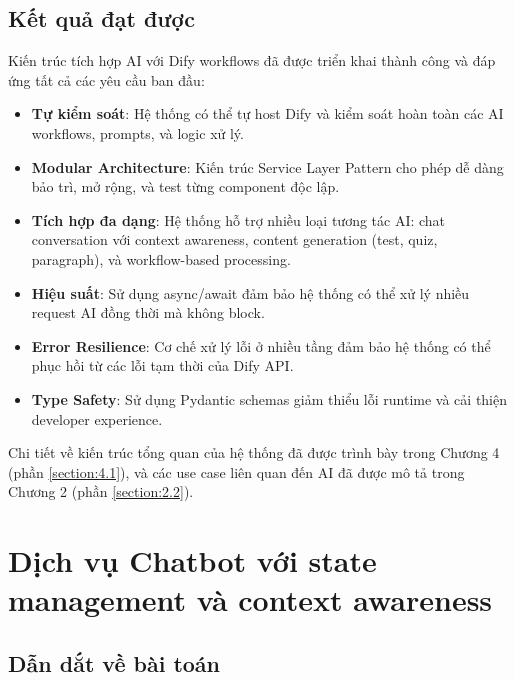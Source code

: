 \documentclass[../DoAn.tex]{subfiles}
\begin{document}
\subsection{Kết quả đạt được}
\label{subsection:5.2.3}

Kiến trúc tích hợp AI với Dify workflows đã được triển khai thành công và đáp ứng tất cả các yêu cầu ban đầu:

\begin{itemize}
    \item \textbf{Tự kiểm soát}: Hệ thống có thể tự host Dify và kiểm soát hoàn toàn các AI workflows, prompts, và logic xử lý.
    
    \item \textbf{Modular Architecture}: Kiến trúc Service Layer Pattern cho phép dễ dàng bảo trì, mở rộng, và test từng component độc lập.
    
    \item \textbf{Tích hợp đa dạng}: Hệ thống hỗ trợ nhiều loại tương tác AI: chat conversation với context awareness, content generation (test, quiz, paragraph), và workflow-based processing.
    
    \item \textbf{Hiệu suất}: Sử dụng async/await đảm bảo hệ thống có thể xử lý nhiều request AI đồng thời mà không block.
    
    \item \textbf{Error Resilience}: Cơ chế xử lý lỗi ở nhiều tầng đảm bảo hệ thống có thể phục hồi từ các lỗi tạm thời của Dify API.
    
    \item \textbf{Type Safety}: Sử dụng Pydantic schemas giảm thiểu lỗi runtime và cải thiện developer experience.
\end{itemize}

Chi tiết về kiến trúc tổng quan của hệ thống đã được trình bày trong Chương 4 (phần \ref{section:4.1}), và các use case liên quan đến AI đã được mô tả trong Chương 2 (phần \ref{section:2.2}).

\section{Dịch vụ Chatbot với state management và context awareness}
\label{section:5.3}

\subsection{Dẫn dắt về bài toán}
\label{subsection:5.3.1}
\end{document}
